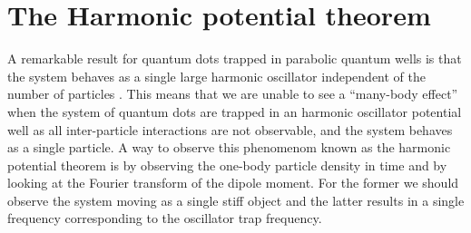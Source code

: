     \section{The Harmonic potential theorem}
        \label{sec:hpt}
        A remarkable result for quantum dots trapped in parabolic quantum wells
        is that the system behaves as a single large harmonic oscillator
        independent of the number of particles \cite{kohn, brey}.
        This means that we are unable to see a ``many-body effect'' when the
        system of quantum dots are trapped in an harmonic oscillator potential
        well as all inter-particle interactions are not observable, and the
        system behaves as a single particle.
        A way to observe this phenomenom known as the harmonic potential theorem
        is by observing the one-body particle density in time and by looking at
        the Fourier transform of the dipole moment.
        For the former we should observe the system moving as a single stiff
        object and the latter results in a single frequency corresponding to the
        oscillator trap frequency.
